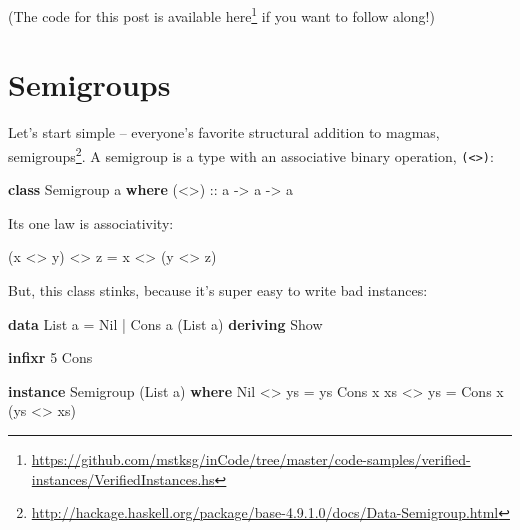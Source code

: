 \documentclass[]{article}
\newenvironment{Shaded}{}{}
\newcommand{\DataTypeTok}[1]{\textcolor[rgb]{0.56,0.13,0.00}{#1}}
\newcommand{\DecValTok}[1]{\textcolor[rgb]{0.25,0.63,0.44}{#1}}
\newcommand{\KeywordTok}[1]{\textcolor[rgb]{0.00,0.44,0.13}{\textbf{#1}}}
\newcommand{\NormalTok}[1]{#1}
\newcommand{\OperatorTok}[1]{\textcolor[rgb]{0.40,0.40,0.40}{#1}}
\newcommand{\OtherTok}[1]{\textcolor[rgb]{0.00,0.44,0.13}{#1}}
\renewcommand{\href}[2]{#2\footnote{\url{#1}}}
\begin{document}
(The code for this post is available
\href{https://github.com/mstksg/inCode/tree/master/code-samples/verified-instances/VerifiedInstances.hs}{here}
if you want to follow along!)

\section{Semigroups}\label{semigroups}

Let's start simple -- everyone's favorite structural addition to magmas,
\href{http://hackage.haskell.org/package/base-4.9.1.0/docs/Data-Semigroup.html}{semigroups}.
A semigroup is a type with an associative binary operation,
\texttt{(\textless{}\textgreater{})}:

\begin{Shaded}
\begin{Highlighting}[]
\KeywordTok{class} \DataTypeTok{Semigroup}\NormalTok{ a }\KeywordTok{where}
\OtherTok{    (\textless{}\textgreater{}) ::}\NormalTok{ a }\OtherTok{{-}\textgreater{}}\NormalTok{ a }\OtherTok{{-}\textgreater{}}\NormalTok{ a}
\end{Highlighting}
\end{Shaded}

Its one law is associativity:

\begin{Shaded}
\begin{Highlighting}[]
\NormalTok{(x }\OperatorTok{\textless{}\textgreater{}}\NormalTok{ y) }\OperatorTok{\textless{}\textgreater{}}\NormalTok{ z }\OtherTok{=}\NormalTok{ x }\OperatorTok{\textless{}\textgreater{}}\NormalTok{ (y }\OperatorTok{\textless{}\textgreater{}}\NormalTok{ z)}
\end{Highlighting}
\end{Shaded}

But, this class stinks, because it's super easy to write bad instances:

\begin{Shaded}
\begin{Highlighting}[]
\KeywordTok{data} \DataTypeTok{List}\NormalTok{ a }\OtherTok{=} \DataTypeTok{Nil} \OperatorTok{|} \DataTypeTok{Cons}\NormalTok{ a (}\DataTypeTok{List}\NormalTok{ a)}
    \KeywordTok{deriving} \DataTypeTok{Show}

\KeywordTok{infixr} \DecValTok{5} \OtherTok{\textasciigrave{}Cons\textasciigrave{}}

\KeywordTok{instance} \DataTypeTok{Semigroup}\NormalTok{ (}\DataTypeTok{List}\NormalTok{ a) }\KeywordTok{where}
    \DataTypeTok{Nil}       \OperatorTok{\textless{}\textgreater{}}\NormalTok{ ys }\OtherTok{=}\NormalTok{ ys}
    \DataTypeTok{Cons}\NormalTok{ x xs }\OperatorTok{\textless{}\textgreater{}}\NormalTok{ ys }\OtherTok{=} \DataTypeTok{Cons}\NormalTok{ x (ys }\OperatorTok{\textless{}\textgreater{}}\NormalTok{ xs)}
\end{Highlighting}
\end{Shaded}
\end{document}
